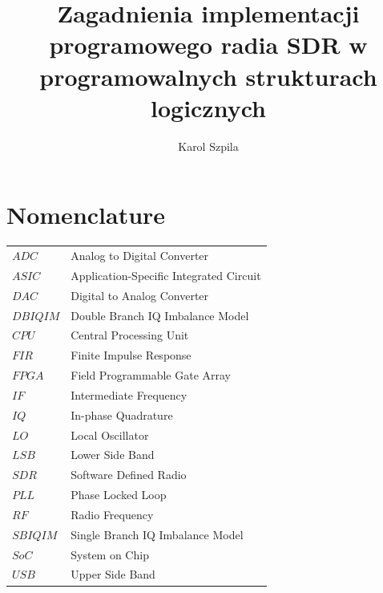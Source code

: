 \documentclass[en,printmode]{mgr}
\title{Zagadnienia implementacji programowego radia SDR w programowalnych strukturach logicznych}
\author{Karol Szpila}
\begin{document}

\maketitle %

\chapter*{Nomenclature}
\begin{table}[!htb]
\begin{tabular}{ll}
$ADC$  & Analog to Digital Converter   \\
$ASIC$ & Application-Specific Integrated Circuit \\
$DAC$  & Digital to Analog Converter   \\
$DBIQIM$ & Double Branch IQ Imbalance Model \\
$CPU$  & Central Processing Unit \\
$FIR$  & Finite Impulse Response \\ 
$FPGA$ & Field Programmable Gate Array \\
$IF$   & Intermediate Frequency \\
$IQ$   & In-phase Quadrature \\
$LO$   & Local Oscillator \\
$LSB$  & Lower Side Band \\
$SDR$  & Software Defined Radio \\
$PLL$  & Phase Locked Loop \\
$RF$   & Radio Frequency \\
$SBIQIM$ & Single Branch IQ Imbalance Model \\
$SoC$  & System on Chip   \\
$USB$  & Upper Side Band \\                  
\end{tabular}
\end{table}

\tableofcontents %

\let\cleardoublepage\clearpage %
\end{document}
